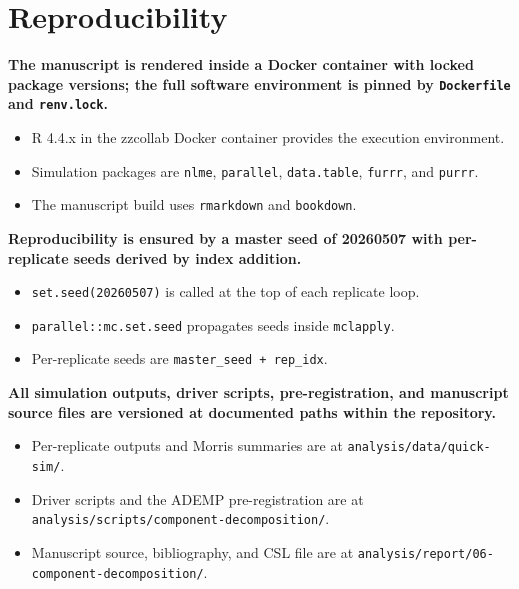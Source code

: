 \documentclass[
  11pt,
]{article}
\begin{document}
\section{Reproducibility}\label{reproducibility}

\textbf{The manuscript is rendered inside a Docker container with locked package versions; the full software environment is pinned by \texttt{Dockerfile} and \texttt{renv.lock}.}

\begin{itemize}\setlength{\itemsep}{2pt}\setlength{\parskip}{0pt}
\item R 4.4.x in the zzcollab Docker container provides the execution environment.
\item Simulation packages are \texttt{nlme}, \texttt{parallel}, \texttt{data.table}, \texttt{furrr}, and \texttt{purrr}.
\item The manuscript build uses \texttt{rmarkdown} and \texttt{bookdown}.
\end{itemize}

\textbf{Reproducibility is ensured by a master seed of 20260507 with per-replicate seeds derived by index addition.}

\begin{itemize}\setlength{\itemsep}{2pt}\setlength{\parskip}{0pt}
\item \texttt{set.seed(20260507)} is called at the top of each replicate loop.
\item \texttt{parallel::mc.set.seed} propagates seeds inside \texttt{mclapply}.
\item Per-replicate seeds are \texttt{master\_seed + rep\_idx}.
\end{itemize}

\textbf{All simulation outputs, driver scripts, pre-registration, and manuscript source files are versioned at documented paths within the repository.}

\begin{itemize}\setlength{\itemsep}{2pt}\setlength{\parskip}{0pt}
\item Per-replicate outputs and Morris summaries are at \texttt{analysis/data/quick-sim/}.
\item Driver scripts and the ADEMP pre-registration are at \texttt{analysis/scripts/component-decomposition/}.
\item Manuscript source, bibliography, and CSL file are at \texttt{analysis/report/06-component-decomposition/}.
\end{itemize}
\end{document}
